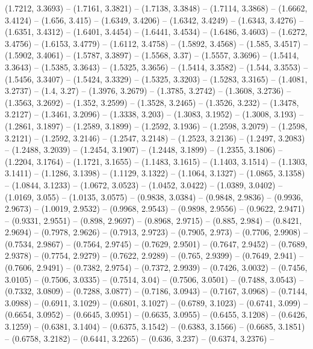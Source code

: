 {   (1.7212, 3.3693) -- (1.7161, 3.3821) -- (1.7138, 3.3848) -- (1.7114, 3.3868) 
  -- (1.6662, 3.4124) -- (1.656, 3.415) -- (1.6349, 3.4206) -- (1.6342, 3.4249) 
  -- (1.6343, 3.4276) -- (1.6351, 3.4312) -- (1.6401, 3.4454) -- (1.6441, 
  3.4534) -- (1.6486, 3.4603) -- (1.6272, 3.4756) -- (1.6153, 3.4779) -- 
  (1.6112, 3.4758) -- (1.5892, 3.4568) -- (1.585, 3.4517) -- (1.5902, 3.4061) --
   (1.5787, 3.3897) -- (1.5568, 3.37) -- (1.5557, 3.3696) -- (1.5414, 3.3643) --
   (1.5385, 3.3643) -- (1.5325, 3.3656) -- (1.5414, 3.3582) -- (1.544, 3.3553) 
  -- (1.5456, 3.3407) -- (1.5424, 3.3329) -- (1.5325, 3.3203) -- (1.5283, 
  3.3165) -- (1.4081, 3.2737) -- (1.4, 3.27) -- (1.3976, 3.2679) -- (1.3785, 
  3.2742) -- (1.3608, 3.2736) -- (1.3563, 3.2692) -- (1.352, 3.2599) -- (1.3528,
   3.2465) -- (1.3526, 3.232) -- (1.3478, 3.2127) -- (1.3461, 3.2096) -- 
  (1.3338, 3.203) -- (1.3083, 3.1952) -- (1.3008, 3.193) -- (1.2861, 3.1897) -- 
  (1.2589, 3.1899) -- (1.2592, 3.1936) -- (1.2598, 3.2079) -- (1.2598, 3.2121) 
  -- (1.2592, 3.2146) -- (1.2547, 3.2148) -- (1.2523, 3.2136) -- (1.2497, 
  3.2083) -- (1.2488, 3.2039) -- (1.2454, 3.1907) -- (1.2448, 3.1899) -- 
  (1.2355, 3.1806) -- (1.2204, 3.1764) -- (1.1721, 3.1655) -- (1.1483, 3.1615) 
  -- (1.1403, 3.1514) -- (1.1303, 3.1411) -- (1.1286, 3.1398) -- (1.1129, 
  3.1322) -- (1.1064, 3.1327) -- (1.0865, 3.1358) -- (1.0844, 3.1233) -- 
  (1.0672, 3.0523) -- (1.0452, 3.0422) -- (1.0389, 3.0402) -- (1.0169, 3.055) --
   (1.0135, 3.0575) -- (0.9838, 3.0384) -- (0.9848, 2.9836) -- (0.9936, 2.9673) 
  -- (1.0019, 2.9532) -- (0.9968, 2.9543) -- (0.9898, 2.9556) -- (0.9622, 
  2.9471) -- (0.9331, 2.9551) -- (0.898, 2.9697) -- (0.8968, 2.9715) -- (0.885, 
  2.984) -- (0.8421, 2.9694) -- (0.7978, 2.9626) -- (0.7913, 2.9723) -- (0.7905,
   2.973) -- (0.7706, 2.9908) -- (0.7534, 2.9867) -- (0.7564, 2.9745) -- 
  (0.7629, 2.9501) -- (0.7647, 2.9452) -- (0.7689, 2.9378) -- (0.7754, 2.9279) 
  -- (0.7622, 2.9289) -- (0.765, 2.9399) -- (0.7649, 2.941) -- (0.7606, 2.9491) 
  -- (0.7382, 2.9754) -- (0.7372, 2.9939) -- (0.7426, 3.0032) -- (0.7456, 
  3.0105) -- (0.7506, 3.0335) -- (0.7514, 3.04) -- (0.7506, 3.0501) -- (0.7488, 
  3.0543) -- (0.7332, 3.0809) -- (0.7288, 3.0877) -- (0.7186, 3.0943) -- 
  (0.7167, 3.0968) -- (0.7144, 3.0988) -- (0.6911, 3.1029) -- (0.6801, 3.1027) 
  -- (0.6789, 3.1023) -- (0.6741, 3.099) -- (0.6654, 3.0952) -- (0.6645, 3.0951)
   -- (0.6635, 3.0955) -- (0.6455, 3.1208) -- (0.6426, 3.1259) -- (0.6381, 
  3.1404) -- (0.6375, 3.1542) -- (0.6383, 3.1566) -- (0.6685, 3.1851) -- 
  (0.6758, 3.2182) -- (0.6441, 3.2265) -- (0.636, 3.237) -- (0.6374, 3.2376) -- 
}
